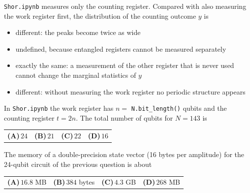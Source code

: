 \documentclass[11pt,a4paper]{article}
\newcommand{\optlabel}[1]{\textbf{(#1)}}
\newenvironment{qitem}[1]{\begin{list}{}{\setlength{\leftmargin}{3.3em}\setlength{\labelwidth}{3.1em}%
  \setlength{\labelsep}{0.2em}\setlength{\topsep}{3pt}\setlength{\parsep}{3pt}}\item[\textbf{Q.#1}\hfill]}{\end{list}}
\newcommand{\qsep}{\par\vspace{2pt}{\color{black!15}\hrule}\vspace{4pt}}
\begin{document}
\begin{qitem}{32}
\texttt{Shor.ipynb} measures only the counting register. Compared with also measuring the work register first, the distribution of the counting
outcome $y$ is
\begin{itemize}[leftmargin=2.6em, labelsep=0.4em, itemsep=2pt, topsep=3pt]
\item[\optlabel{A}] different: the peaks become twice as wide
\item[\optlabel{B}] undefined, because entangled registers cannot be measured separately
\item[\optlabel{C}] exactly the same: a measurement of the other register that is never used cannot change the marginal statistics of $y$
\item[\optlabel{D}] different: without measuring the work register no periodic structure appears
\end{itemize}
\end{qitem}
\qsep

\begin{qitem}{33}
In \texttt{Shor.ipynb} the work register has $n = $ \texttt{N.bit\_length()} qubits and the counting register $t = 2n$. The total number of qubits for
$N = 143$ is
\par\smallskip\noindent\begin{tabularx}{\linewidth}{@{}*{4}{L}@{}}
\optlabel{A}\,$24$ & \optlabel{B}\,$21$ & \optlabel{C}\,$22$ & \optlabel{D}\,$16$
\end{tabularx}
\end{qitem}
\qsep

\begin{qitem}{34}
The memory of a double-precision state vector (16 bytes per amplitude) for the 24-qubit circuit of the previous question is about
\par\smallskip\noindent\begin{tabularx}{\linewidth}{@{}*{4}{L}@{}}
\optlabel{A}\,$16.8$ MB & \optlabel{B}\,$384$ bytes & \optlabel{C}\,$4.3$ GB & \optlabel{D}\,$268$ MB
\end{tabularx}
\end{qitem}
\qsep
\end{document}

